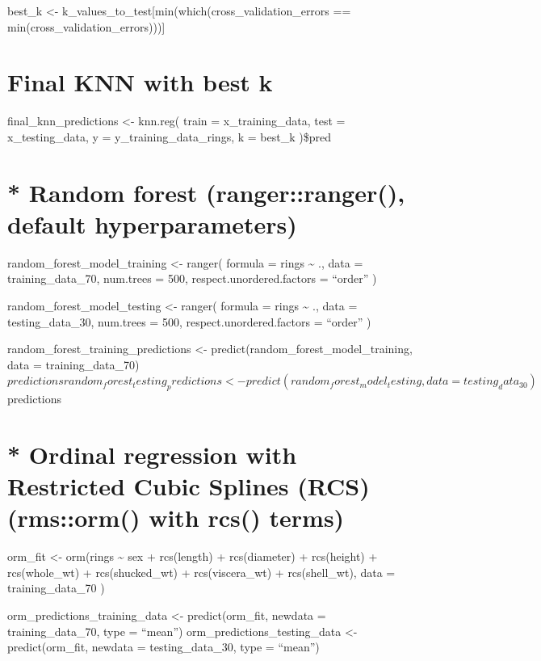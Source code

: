 \documentclass[
  letterpaper,
  DIV=11,
  numbers=noendperiod]{scrreprt}
\begin{document}
{best\_k \textless-
k\_values\_to\_test{[}min(which(cross\_validation\_errors ==
min(cross\_validation\_errors))){]}


\chapter{Final KNN with best k}\label{final-knn-with-best-k}

final\_knn\_predictions \textless- knn.reg( train = x\_training\_data,
test = x\_testing\_data, y = y\_training\_data\_rings, k = best\_k
)\$pred


\chapter{* Random forest (ranger::ranger(), default
hyperparameters)}\label{random-forest-rangerranger-default-hyperparameters}

random\_forest\_model\_training \textless- ranger( formula = rings
\textasciitilde{} ., data = training\_data\_70, num.trees = 500,
respect.unordered.factors = ``order'' )

random\_forest\_model\_testing \textless- ranger( formula = rings
\textasciitilde{} ., data = testing\_data\_30, num.trees = 500,
respect.unordered.factors = ``order'' )

random\_forest\_training\_predictions \textless-
predict(random\_forest\_model\_training, data =
training\_data\_70)\(predictions
random_forest_testing_predictions <- predict(random_forest_model_testing, data = testing_data_30)\)predictions


\chapter{* Ordinal regression with Restricted Cubic Splines (RCS)
(rms::orm() with rcs()
terms)}\label{ordinal-regression-with-restricted-cubic-splines-rcs-rmsorm-with-rcs-terms}

orm\_fit \textless- orm(rings \textasciitilde{} sex + rcs(length) +
rcs(diameter) + rcs(height) + rcs(whole\_wt) + rcs(shucked\_wt) +
rcs(viscera\_wt) + rcs(shell\_wt), data = training\_data\_70 )

orm\_predictions\_training\_data \textless- predict(orm\_fit, newdata =
training\_data\_70, type = ``mean'') orm\_predictions\_testing\_data
\textless- predict(orm\_fit, newdata = testing\_data\_30, type =
``mean'')

}
\end{document}
